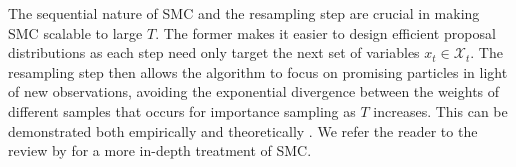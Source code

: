 The sequential nature of SMC and the resampling step are crucial in making SMC scalable to large $T$.
The former makes it easier to design efficient proposal distributions as each step need only target 
the next set of variables $x_t \in \mathcal{X}_t$. 
The resampling step then allows the algorithm to focus on promising particles in light of new 
observations, avoiding the exponential divergence between the weights of different samples that 
occurs for importance sampling as $T$ increases.
This can be demonstrated both empirically and theoretically \citep[Chapter 9]{del2004feynman}.
We refer the reader to the review by \citet{doucet2009tutorial} for a more in-depth treatment of SMC.